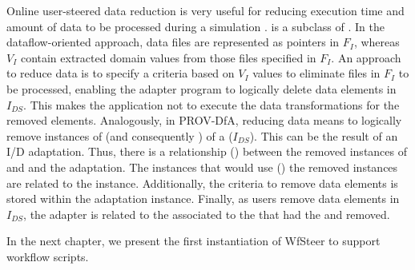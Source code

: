 Online user-steered data reduction is very useful for reducing execution time and amount of data to be processed during a simulation \cite{Souza2017Data}.
 is a subclass of .
In the dataflow-oriented approach, data files are represented as pointers in $F_I$,
whereas $V_I$ contain extracted domain values from those files specified in $F_I$.
An approach to reduce data is to specify a criteria based on $V_I$ values to eliminate files
in $F_I$ to be processed, enabling the adapter program to logically delete data elements in  $I_{DS}$. This makes the application not to execute the data transformations for the removed elements.
Analogously, in PROV-DfA, reducing data means to logically remove instances of  (and consequently ) of a  ($I_{DS}$).
This can be the result of an I/D adaptation.
Thus, there is a relationship () between the removed instances of 
and  and the adaptation. The  instances that would use () the removed  instances are related to the  instance. Additionally, the criteria to remove data elements is stored within the adaptation instance.
Finally, as users remove data elements in $I_{DS}$, the adapter is related to the  associated to the  that had the  and  removed.








In the next chapter, we present the first instantiation of WfSteer to support workflow scripts.